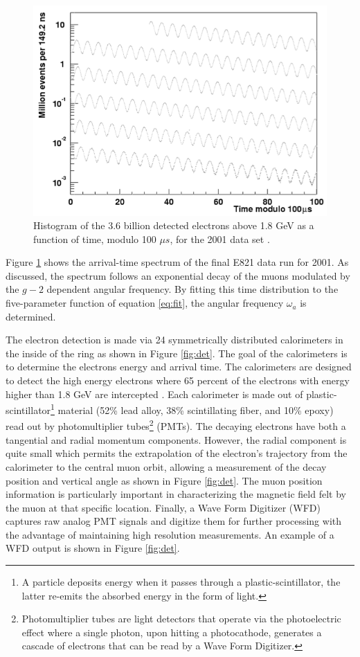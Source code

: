 \documentclass{outhesis}
\begin{document}
 \begin{figure}
  \centering
  \includegraphics[scale=0.5]{figures/oscillation}
  \caption{Histogram of the 3.6 billion detected electrons above 1.8 GeV as a function of time, modulo 100 $\mu s$, for the 2001 data set \cite{bnl}.}
  \label{fig:osc}
\end{figure}
Figure \ref{fig:osc} shows the arrival-time spectrum of the final E821 data run for 2001. As discussed, the spectrum follows an exponential decay of the muons modulated by the $g-2$ dependent angular frequency. By fitting this time distribution to the five-parameter function of equation \ref{eq:fit}, the angular frequency $\omega_a$ is determined.

The electron detection is made via 24 symmetrically distributed calorimeters in the inside of the ring as shown in Figure \ref{fig:det}. The goal of the calorimeters is to determine the electrons energy and arrival time. The calorimeters are designed to detect the high energy electrons where 65 percent of the electrons with energy higher than 1.8 GeV are intercepted \cite[p.~29]{bnl}. Each calorimeter is made out of plastic-scintillator\footnote{A particle deposits energy when it passes through a plastic-scintillator, the latter re-emits the absorbed energy in the form of light. } material (52\% lead alloy, 38\% scintillating fiber, and 10\% epoxy) read out by photomultiplier tubes\footnote{Photomultiplier tubes are light detectors that operate via the photoelectric effect where a single photon, upon hitting a photocathode, generates a cascade of electrons that can be read by a Wave Form Digitizer.} (PMTs). The decaying electrons have both a tangential and radial momentum components. However, the radial component is quite small which permits the extrapolation of the electron's trajectory from the calorimeter to the central muon orbit, allowing a measurement of the decay position and vertical angle as shown in Figure \ref{fig:det}. The muon position information is particularly important in characterizing the magnetic field felt by the muon at that specific location. 
Finally, a Wave Form Digitizer (WFD) captures raw analog PMT signals and digitize them for further processing with the advantage of maintaining high resolution measurements. An example of a WFD output is shown in Figure \ref{fig:det}.
\end{document}
